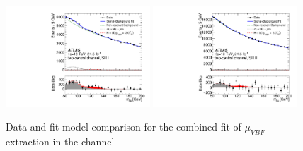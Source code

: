 \begin{figure}[htbp]
  \centering
 \includegraphics[width=0.48\textwidth]{figures/VBF/comb_vbfonly_testVBF_ICHEP_2cen_SRI_vbfincl.pdf}
 \includegraphics[width=0.48\textwidth]{figures/VBF/comb_vbfonly_testVBF_ICHEP_2cen_SRII_vbfincl.pdf}\\

\caption{Data and fit model comparison for the combined fit of $\mu_{VBF}$ extraction in the \twocentral channel}
  \label{fig:higgsfit_2cen}
\end{figure}

